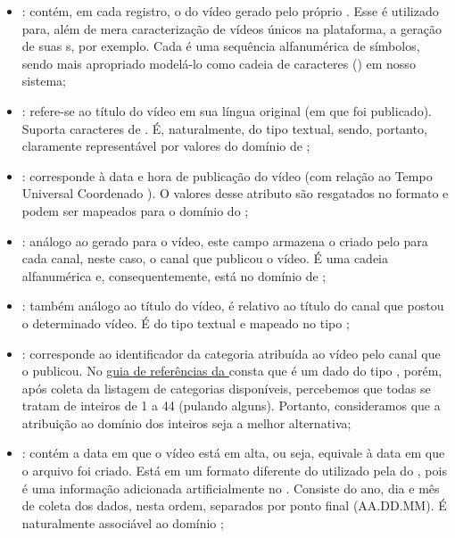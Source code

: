   \begin{itemize}
    \item {}: contém, em cada registro, o  do vídeo gerado pelo próprio . Esse  é utilizado para, além de mera caracterização de vídeos únicos na plataforma, a geração de suas s, por exemplo. Cada  é uma sequência alfanumérica de símbolos, sendo mais apropriado modelá-lo como cadeia de caracteres () em nosso sistema;
    \item {}: refere-se ao título do vídeo em sua língua original (em que foi publicado). Suporta caracteres de . É, naturalmente, do tipo textual, sendo, portanto, claramente representável por valores do domínio de ;
    \item {}: corresponde à data e hora de publicação do vídeo (com relação ao Tempo Universal Coordenado ). O valores desse atributo são resgatados no formato \href{https://www.w3.org/TR/NOTE-datetime}{} e podem ser mapeados para o domínio  do ;
    \item {}: análogo ao  gerado para o vídeo, este campo armazena o  criado pelo  para cada canal, neste caso, o canal que publicou o vídeo. É uma cadeia alfanumérica e, consequentemente, está no domínio de ;
    \item {}: também análogo ao título do vídeo, é relativo ao título do canal que postou o determinado vídeo. É do tipo textual e mapeado no tipo ;
    \item {}: corresponde ao identificador da categoria atribuída ao vídeo pelo canal que o publicou. No \href{https://developers.google.com/youtube/v3/docs/videos?hl=pt-br#snippet.categoryId}{guia de referências da } consta que é um dado do tipo , porém, após coleta da listagem de categorias disponíveis, percebemos que todas se tratam de inteiros de 1 a 44 (pulando alguns). Portanto, consideramos que a atribuição ao domínio dos inteiros seja a melhor alternativa;
    \item {}: contém a data em que o vídeo está em alta, ou seja, equivale à data em que o arquivo  foi criado. Está em um formato diferente do utilizado pela  do , pois é uma informação adicionada artificialmente no . Consiste do ano, dia e mês de coleta dos dados, nesta ordem, separados por ponto final (AA.DD.MM). É naturalmente associável ao domínio ;

\end{itemize}
